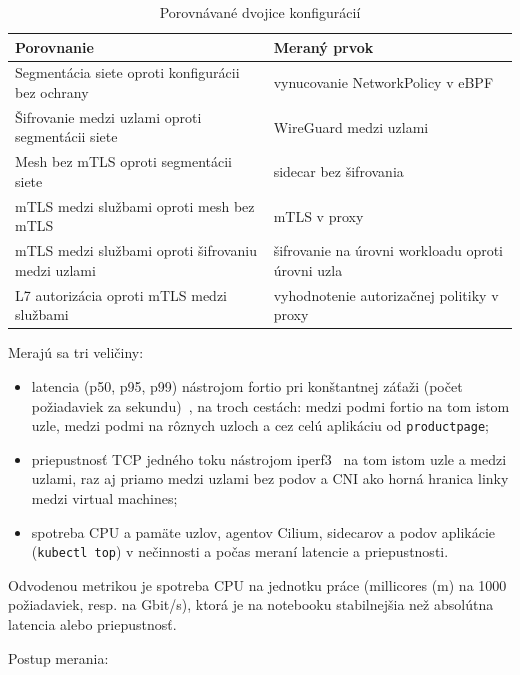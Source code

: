 \begin{table}[ht!]
  \centering
  \caption{Porovnávané dvojice konfigurácií}
  \label{tab:deltas}
  \footnotesize
  \renewcommand{\arraystretch}{1.15}
  \begin{tabularx}{\textwidth}{@{}>{\raggedright\arraybackslash}p{6.2cm}>{\raggedright\arraybackslash}X@{}}
    \toprule
    Porovnanie & Meraný prvok \\
    \midrule
    Segmentácia siete oproti konfigurácii bez ochrany & vynucovanie NetworkPolicy v eBPF \\
    Šifrovanie medzi uzlami oproti segmentácii siete & WireGuard medzi uzlami \\
    Mesh bez mTLS oproti segmentácii siete & sidecar bez šifrovania \\
    mTLS medzi službami oproti mesh bez mTLS & mTLS v proxy \\
    mTLS medzi službami oproti šifrovaniu medzi uzlami & šifrovanie na úrovni workloadu oproti úrovni uzla \\
    L7 autorizácia oproti mTLS medzi službami & vyhodnotenie autorizačnej politiky v proxy \\
    \bottomrule
  \end{tabularx}
\end{table}

Merajú sa tri veličiny:

\begin{itemize}
  \item latencia (p50, p95, p99) nástrojom fortio pri konštantnej záťaži (počet požiadaviek za sekundu)~\cite{fortio}, na troch cestách: medzi podmi fortio na tom istom uzle, medzi podmi na rôznych uzloch a cez celú aplikáciu od \texttt{productpage};
  \item priepustnosť TCP jedného toku nástrojom iperf3~\cite{iperf3} na tom istom uzle a medzi uzlami, raz aj priamo medzi uzlami bez podov a CNI ako horná hranica linky medzi virtual machines;
  \item spotreba CPU a pamäte uzlov, agentov Cilium, sidecarov a podov aplikácie (\texttt{kubectl top}) v nečinnosti a počas meraní latencie a priepustnosti.
\end{itemize}

Odvodenou metrikou je spotreba CPU na jednotku práce (millicores (m) na 1000 požiadaviek, resp. na Gbit/s), ktorá je na notebooku stabilnejšia než absolútna latencia alebo priepustnosť.

Postup merania:

